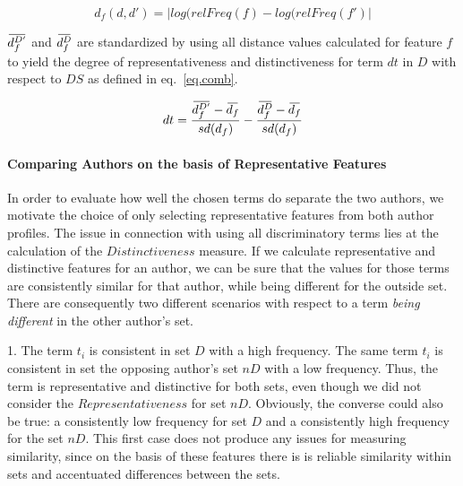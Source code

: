 \documentclass[a4paper,10pt,twoside,fleqn]{article}
\newcommand{\overbar}[1]{\mkern 2.0mu\overline{\mkern-2.0mu#1\mkern-2.0mu}\mkern 2.0mu}
\begin{document}
\begin{equation} \label{eq.dist}
 d_f(d,d') = |log(relFreq(f) - log(relFreq(f')|
\end{equation}


$\overbar{d_f^{D'}}$  and $\overbar{d_f^{D}}$ are standardized by using all 
distance values calculated for feature $f$ to yield the 
degree of representativeness and distinctiveness for
term $dt$ in $D$ with respect to $DS$ as defined in eq.~\ref{eq.comb}.
 
 \begin{equation}\label{eq.comb}
 dt = \frac{\overbar{d^{D'}_f} - \overbar{d_f} }{sd(d_f)} - \frac{\overbar{d^{D}_f} - \overbar{d_f}}{sd(d_f)}
\end{equation}


\paragraph{Comparing Authors on the basis of Representative Features}

In order to evaluate how well the chosen terms do separate the two authors, we motivate the choice of only selecting representative features from both author profiles. 
The issue in connection with using all discriminatory terms lies at the calculation of the $Distinctiveness$ measure. 
If we calculate representative and distinctive features for an author, we can be sure that the values for those 
terms are consistently similar for that author, while being different for the outside set. 
There are consequently two different scenarios with respect to a term \emph{being different} in the other author's set. 

1. The term $t_i$ is consistent in set $D$ with a high frequency. The same term $t_i$ is consistent in set the opposing author's set $nD$ with a low frequency. 
Thus, the term is representative and distinctive for both sets, even though we did not consider the $Representativeness$ for set $nD$. 
Obviously, the converse could also be true: a consistently low frequency for set $D$ and a consistently high frequency for the set $nD$.
This first case does not produce any issues for measuring similarity, since on the basis of these features there is is reliable similarity within sets and
accentuated differences between the sets. 
\end{document}
